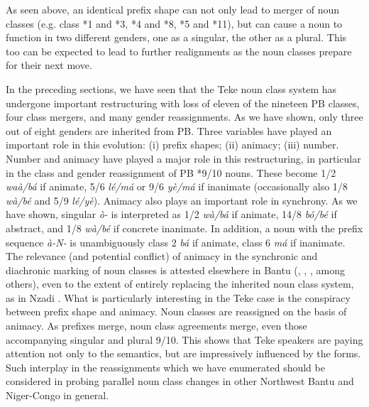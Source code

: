 \documentclass[output=paper,,modfonts,nonflat]{langsci/langscibook-Hyman-et-al}
\begin{document}
As seen above, an identical prefix shape can not only lead to merger of noun classes (e.g. class *1 and *3, *4 and *8, *5 and *11), but can cause a noun to function in two different genders, one as a singular, the other as a plural. This too can be expected to lead to further realignments as the noun classes prepare for their next move.

In the preceding sections, we have seen that the Teke noun class system has undergone important restructuring with loss of eleven of the nineteen PB classes, four class mergers, and many gender reassignments. As we have shown, only three out of eight genders are inherited from PB. Three variables have played an important role in this evolution: (i) prefix shapes; (ii) animacy; (iii) number. Number and animacy have played a major role in this restructuring, in particular in the class and gender reassignment of PB *9/10 nouns. These become 1/2 \textit{waà/bá} if animate, 5/6 \textit{lé/má} or 9/6 \textit{yè/má} if inanimate (occasionally also 1/8 \textit{wà/bé} and 5/9 \textit{lé/yè}). Animacy also plays an important role in synchrony. As we have shown, singular \textit{ò-} is interpreted as 1/2 \textit{wà/bá} if animate, 14/8 \textit{bó/bé} if abstract, and 1/8 \textit{wà/bé} if concrete inanimate. In addition, a noun with the prefix sequence \textit{à-N-} is unambiguously class 2 \textit{bá} if animate, class 6 \textit{má} if inanimate. The relevance (and potential conflict) of animacy in the synchronic and diachronic marking of noun classes is attested elsewhere in Bantu (\cite{wald1975}, \cite{maho1999}, \cite{contini2008}, among others), even to the extent of entirely replacing the inherited noun class system, as in Nzadi \citep{craneetal2011}. What is particularly interesting in the Teke case is the conspiracy between prefix shape and animacy. Noun classes are reassigned on the basis of animacy. As prefixes merge, noun class agreements merge, even those accompanying singular and plural 9/10. This shows that Teke speakers are paying attention not only to the semantics, but are impressively influenced by the forms. Such interplay in the reassignments which we have enumerated should be considered in probing parallel noun class changes in other Northwest Bantu and Niger-Congo in general.


\sloppy
\printbibliography[heading=subbibliography,notkeyword=this]
\end{document}
